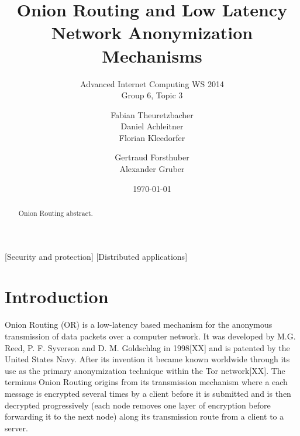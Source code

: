 \documentclass{sig-alternate}
\begin{document}
\title{Onion Routing and Low Latency Network Anonymization Mechanisms}
\subtitle{Advanced Internet Computing WS 2014 \\ Group 6, Topic 3}


\author{
\alignauthor
Fabian Theuretzbacher\\
\alignauthor
Daniel Achleitner\\
\alignauthor Florian Kleedorfer\\
\and  %
\alignauthor Gertraud Forsthuber\\
\alignauthor Alexander Gruber\\
\and
\and
{}
}

\date{\today}
\maketitle

\begin{abstract}

Onion Routing abstract.

\end{abstract}

[Security and protection]
[Distributed applications]



\section{Introduction}
Onion Routing (OR) is a low-latency based mechanism for the anonymous transmission of data packets over a computer network. It was developed by M.G. Reed, P. F. Syverson and D. M. Goldschlag in 1998[XX] and is patented by the United States Navy. After its invention it became known worldwide through its use as the primary anonymization technique within the Tor network[XX]. The terminus Onion Routing origins from its transmission mechanism where a each message is encrypted several times by a client before it is submitted and is then decrypted progressively (each node removes one layer of encryption before forwarding it to the next node) along its transmission route from a client to a server. 
\end{document}
